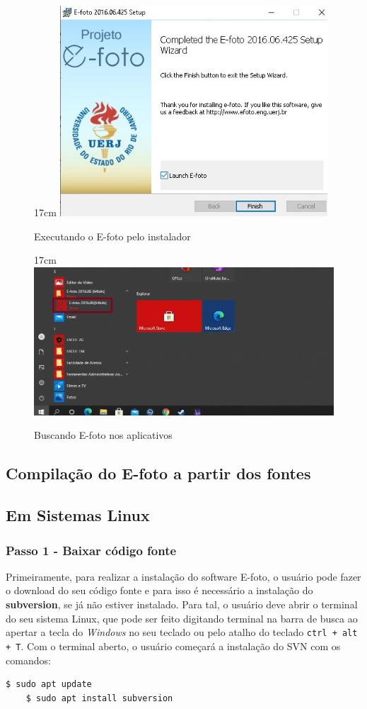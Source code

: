 \begin{figure}[!ht]{17cm}
	\centering
	\includegraphics[width=10cm]{Figuras/launch1.jpg}
	\caption{Executando o E-foto pelo instalador} \label{fig:launch1}
\end{figure}

\begin{figure}[!ht]{17cm}
	\centering
	\includegraphics[width=12cm]{Figuras/launch2.jpg}
	\caption{Buscando E-foto nos aplicativos} \label{fig:launch2}
\end{figure}

\subsection{Compilação do E-foto a partir dos fontes}
\subsection{Em Sistemas Linux}

\subsubsection{Passo 1 - Baixar código fonte}
Primeiramente, para realizar a instalação do software E-foto, o usuário pode fazer o download do seu código fonte e para isso é necessário a instalação do \textbf{subversion}, se já não estiver instalado. Para tal, o usuário deve abrir o terminal do seu sistema Linux, que pode ser feito digitando terminal na barra de busca ao apertar a tecla do \textit{Windows} no seu teclado ou pelo atalho do teclado \texttt{ctrl + alt + T}. Com o terminal aberto, o usuário começará a instalação do SVN com os comandos: 
\begin{lstlisting}[language=bash]
	$ sudo apt update
	$ sudo apt install subversion
\end{lstlisting}

